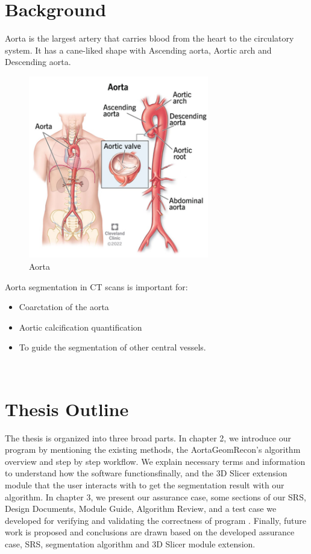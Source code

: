 \section{Background} \label{bg}
Aorta is the largest artery that carries blood from the heart to the circulatory system. It has a cane-liked shape with Ascending aorta, Aortic arch and Descending aorta. 

\begin{figure}[H]
    \centering
    \includegraphics[width=0.7\textwidth]{figures/Sample/Aorta.png}
    \caption[Aorta]{Aorta}
    \label{fig_aorta}
\end{figure}

Aorta segmentation in CT scans is important for:
\begin{itemize}
\item Coarctation of the aorta
\item Aortic calcification quantification
\item To guide the segmentation of other central vessels. 
\end{itemize} ~\\

\section{Thesis Outline} \label{TO}

The thesis is organized into three broad parts. In chapter 2, we introduce our program \progname{} by mentioning the existing methods, the AortaGeomRecon's algorithm overview and step by step  workflow. We explain necessary terms and information to understand how the software functionsfinally, and the 3D Slicer extension module that the user interacts with to get the segmentation result with our algorithm. In chapter 3, we present our assurance case, some sections of our SRS, Design Documents, Module Guide, Algorithm Review, and a test case we developed for verifying and validating the correctness of program \progname{}. Finally, future work is proposed and conclusions are drawn based on the developed assurance case, SRS, segmentation algorithm and 3D Slicer module extension.